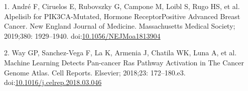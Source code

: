 \documentclass[10pt,letterpaper]{article}
\begin{document}
\hypertarget{refs}{}
\leavevmode\hypertarget{ref-andre_2019_alpelisib_nengljmeda}{}%
1. André F, Ciruelos E, Rubovszky G, Campone M, Loibl S, Rugo HS, et al.
Alpelisib for PIK3CA-Mutated, Hormone ReceptorPositive Advanced Breast
Cancer. New England Journal of Medicine. Massachusetts Medical Society;
2019;380: 1929--1940.
doi:\href{https://doi.org/10.1056/NEJMoa1813904}{10.1056/NEJMoa1813904}

\leavevmode\hypertarget{ref-way_2018_machine_cellreports}{}%
2. Way GP, Sanchez-Vega F, La K, Armenia J, Chatila WK, Luna A, et al.
Machine Learning Detects Pan-cancer Ras Pathway Activation in The Cancer
Genome Atlas. Cell Reports. Elsevier; 2018;23: 172--180.e3.
doi:\href{https://doi.org/10.1016/j.celrep.2018.03.046}{10.1016/j.celrep.2018.03.046}

\nolinenumbers
\end{document}
